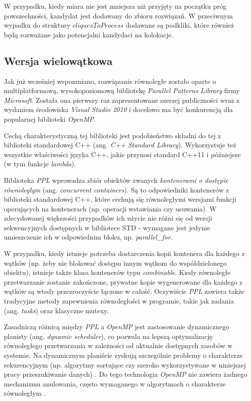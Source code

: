 \documentclass[12pt]{article}
\begin{document}
W przypadku, kiedy miara nie jest mniejsza niż przyjęty na początku próg powszechności, kandydat jest dodawany do zbioru rozwiązań. W przeciwnym wypadku do struktury $ cliquesToProcess $ dodawane są podkliki, które również będą rozważane jako potencjalni kandydaci na kolokacje.

\subsection{Wersja wielowątkowa}

Jak już wcześniej wspomniano, rozwiązanie równoległe zostało oparte o multiplatformową, wysokopoziomową bibliotekę \textit{Parallel Patterns Library} firmy \textit{Microsoft}. Została ona pierwszy raz zaprezentowane szerzej publiczności wraz z wydaniem środowiska \textit{Visual Studio 2010} i docelowo ma być konkurencją dla popularnej biblioteki \textit{OpenMP}. 

Cechą charakterystyczną tej biblioteki jest podobieństwo składni do tej z biblioteki standardowej C++ (ang. \textit{C++ Standard Library}). Wykorzystuje też wszystkie właściwości języka C++, jakie przynosi standard C++11 i późniejsze (w tym funkcje \textit{lambda}).

Biblioteka \textit{PPL} wprowadza zbiór obiektów zwanych \textit{kontenerami o dostępie równoległym} (ang. \textit{concurrent containers}). Są to odpowiedniki kontenerów z biblioteki standardowej C++, które cechują się równoległymi wersjami funkcji operujących na kontenerach (np. operacji wstawiania czy usuwania). W zdecydowanej większości przypadków ich użycie nie różni się od wersji sekwencyjnych dostępnych w bibliotece STD - wymagane jest jedynie umieszczenie ich w odpowiednim bloku, np. \textit{parallel\_for}. 

W przypadku, kiedy istnieje potrzeba dostarczenia kopii kontenera dla każdego z wątków (np. żeby nie blokować dostępu innym wątkom do współdzielonego obiektu), istnieje także klasa kontenerów typu \textit{combinable}. Kiedy równoległe przetwarzanie zostanie zakończone, prywatne kopie wygenerowane dla każdego z wątków są wtedy przezroczyście łączone w całość. Oczywiście \textit{PPL} zawiera także tradycyjne metody zapewnienia równoległości w programie, takie jak zadania (ang. \textit{tasks}) oraz klasyczne mutexy.

Zasadniczą różnicą między \textit{PPL} a \textit{OpenMP} jest zastosowanie dynamicznego planisty (ang. \textit{dynamic scheduler}), co pozwala na lepszą optymalizację równoległego przetwarzania w zależności od aktualnie dostępnych zasobów w systemie. Na dynamicznym planiście zyskują szczególnie problemy o charakterze rekurencyjnym (np. algorytmy sortujące czy szeroko wykorzystywane w niniejszej pracy przeszukiwanie danych) \cite{mikromiekki}. Do tego technologia \textit{OpenMP} nie zawiera żadnego mechanizmu anulowania, często wymaganego w algorytmach o charakterze równoległym \cite{stak}.
\end{document}
